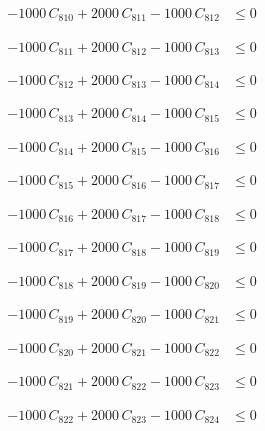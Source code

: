 \documentclass[a4paper,11pt]{article}
\begin{document}
\begin{align}
-1000\,C_{810} + 2000\,C_{811} - 1000\,C_{812} &\leq 0 \nonumber
\end{align}

\begin{align}
-1000\,C_{811} + 2000\,C_{812} - 1000\,C_{813} &\leq 0 \nonumber
\end{align}

\begin{align}
-1000\,C_{812} + 2000\,C_{813} - 1000\,C_{814} &\leq 0 \nonumber
\end{align}

\begin{align}
-1000\,C_{813} + 2000\,C_{814} - 1000\,C_{815} &\leq 0 \nonumber
\end{align}

\begin{align}
-1000\,C_{814} + 2000\,C_{815} - 1000\,C_{816} &\leq 0 \nonumber
\end{align}

\begin{align}
-1000\,C_{815} + 2000\,C_{816} - 1000\,C_{817} &\leq 0 \nonumber
\end{align}

\begin{align}
-1000\,C_{816} + 2000\,C_{817} - 1000\,C_{818} &\leq 0 \nonumber
\end{align}

\begin{align}
-1000\,C_{817} + 2000\,C_{818} - 1000\,C_{819} &\leq 0 \nonumber
\end{align}

\begin{align}
-1000\,C_{818} + 2000\,C_{819} - 1000\,C_{820} &\leq 0 \nonumber
\end{align}

\begin{align}
-1000\,C_{819} + 2000\,C_{820} - 1000\,C_{821} &\leq 0 \nonumber
\end{align}

\begin{align}
-1000\,C_{820} + 2000\,C_{821} - 1000\,C_{822} &\leq 0 \nonumber
\end{align}

\begin{align}
-1000\,C_{821} + 2000\,C_{822} - 1000\,C_{823} &\leq 0 \nonumber
\end{align}

\begin{align}
-1000\,C_{822} + 2000\,C_{823} - 1000\,C_{824} &\leq 0 \nonumber
\end{align}
\end{document}
